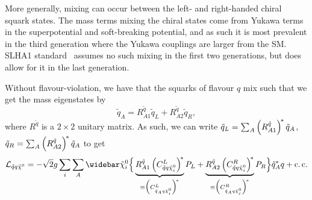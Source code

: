 \documentclass[../main.tex]{subfiles}
\begin{document}
More generally, mixing can occur between the left- and right-handed chiral squark states.
The mass terms mixing the chiral states come from Yukawa terms in the superpotential and soft-breaking potential, and as such it is most prevalent in the third generation where the Yukawa couplings are larger from the SM\@.
SLHA1 standard~\cite{SLHA1} assumes no such mixing in the first two generations, but does allow for it in the last generation.

Without flavour-violation, we have that the squarks of flavour \(q\) mix such that we get the mass eigenstates by
\begin{equation}
  \tilde{q}_{A} = R_{A1}^{\tilde{q}} \tilde{q}_{L} + R_{A2}^{\tilde{q}} \tilde{q}_{R},
\end{equation}
where \(R^{\tilde{q}}\) is a \(2\times 2\) unitary matrix.
As such, we can write \(\tilde{q}_{L} = \sum_A \left(R^{\tilde{q}}_{A1}\right)^{\!\ast} \tilde{q}_{A}\), \(\tilde{q}_{R} = \sum_A \left(R^{\tilde{q}}_{A2}\right)^{\!\ast} \tilde{q}_{A}\) to get
\begin{equation}
  \label{susy:eq:sqqneu-interaction-L}
  \L_{\tilde{q} q \tilde{\chi}^0} = -\sqrt{2} g \sum_{i} \sum_A \barnino[i] \Big\{ \underbrace{R^{\tilde{q}}_{A1} \pclosed{C_{\tilde{q} q \tilde{\chi}_i^0}^{L}}^{\!\ast}}_{\equiv \Big(C_{\tilde{q}_A q \tilde{\chi}_i^0}^{L}\Big)^{\!\ast}} P_L + \underbrace{R^{\tilde{q}}_{A2} \pclosed{C_{\tilde{q} q \tilde{\chi}_i^0}^{R}}^{\!\ast}}_{\equiv \Big(C_{\tilde{q}_A q \tilde{\chi}_i^0}^{R}\Big)^{\!\ast}} P_R \Big\} \tilde{q}_{A}^\ast q + \cc
\end{equation}
\end{document}
